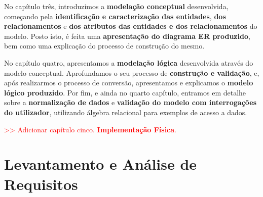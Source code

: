 \documentclass[a4paper,12pt]{scrreprt}
\begin{document}
    No capítulo três, introduzimos a \textbf{modelação conceptual} desenvolvida, começando pela \textbf{identificação e caracterização das entidades}, \textbf{dos relacionamentos} e \textbf{dos atributos das entidades e dos relacionamentos} do modelo. Posto isto, é feita uma \textbf{apresentação do diagrama ER produzido}, bem como uma explicação do processo de construção do mesmo.

    No capítulo quatro, apresentamos a \textbf{modelação lógica} desenvolvida através do modelo conceptual. Aprofundamos o seu processo de \textbf{construção e validação}, e, após realizarmos o processo de conversão, apresentamos e explicamos o \textbf{modelo lógico produzido}.
    Por fim, e ainda no quarto capítulo, entramos em detalhe sobre a \textbf{normalização de dados} e \textbf{validação do modelo com interrogações do utilizador}, utilizando álgebra relacional para exemplos de acesso a dados.

    \textcolor{red}{>> Adicionar capítulo cinco. \textbf{Implementação Física}.}



\chapter{Levantamento e Análise de Requisitos}
    \label{requisitos}
\end{document}
